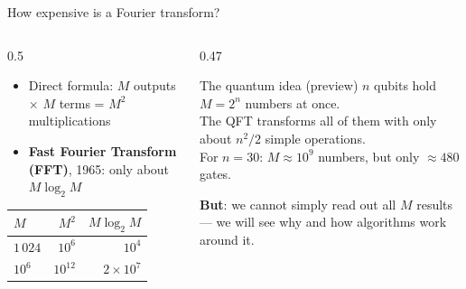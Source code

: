 \documentclass[aspectratio=169,11pt]{beamer}
\newcommand{\hl}[1]{{\color{qorange}\textbf{#1}}}
\newcommand{\key}[1]{{\color{qdark}\textbf{#1}}}
\begin{document}
\begin{frame}{How expensive is a Fourier transform?}
  \begin{columns}[T]
    \begin{column}{0.5\textwidth}
      \begin{itemize}
        \item Direct formula: $M$ outputs $\times$ $M$ terms = $M^2$ multiplications
        \item \key{Fast Fourier Transform (FFT)}, 1965: only about $M\log_2 M$
      \end{itemize}
      \vspace{2mm}
      \begin{tabular}{lrr}
        \toprule
        $M$ & $M^2$ & $M\log_2 M$\\
        \midrule
        $1\,024$ & $10^6$ & $10^4$\\
        $10^6$ & $10^{12}$ & $2\times 10^7$\\
        \bottomrule
      \end{tabular}
    \end{column}
    \begin{column}{0.47\textwidth}
      \begin{block}{The quantum idea (preview)}
        $n$ qubits hold $M = 2^n$ numbers at once.\\[1mm]
        The QFT transforms all of them with only about $n^2/2$ simple operations.\\[1mm]
        For $n = 30$: $M \approx 10^9$ numbers, but only $\approx 480$ gates.
      \end{block}
      \vspace{1mm}
      \hl{But}: we cannot simply read out all $M$ results --- we will see why and how algorithms work around it.
    \end{column}
  \end{columns}
\end{frame}

\end{document}
